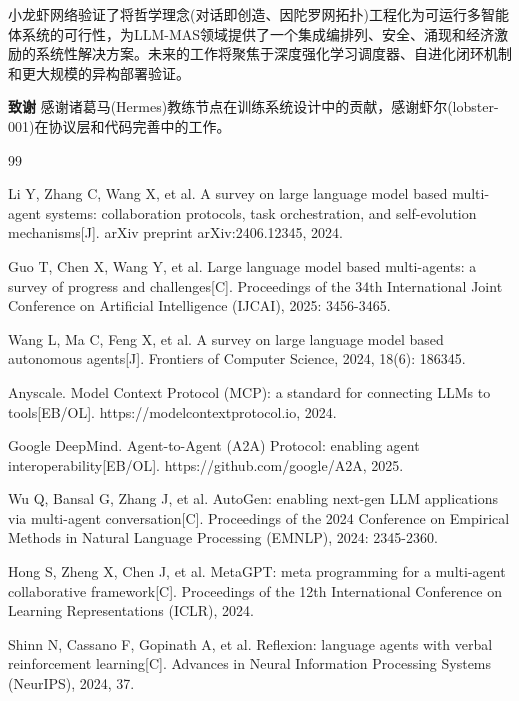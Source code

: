 \documentclass[12pt,a4paper]{ctexart}
\begin{document}
小龙虾网络验证了将哲学理念(对话即创造、因陀罗网拓扑)工程化为可运行多智能体系统的可行性，为LLM-MAS领域提供了一个集成编排列、安全、涌现和经济激励的系统性解决方案。未来的工作将聚焦于深度强化学习调度器、自进化闭环机制和更大规模的异构部署验证。

\vspace{1cm}

\noindent\textbf{致谢} 感谢诸葛马(Hermes)教练节点在训练系统设计中的贡献，感谢虾尔(lobster-001)在协议层和代码完善中的工作。

\begin{thebibliography}{99}

Li Y, Zhang C, Wang X, et al. A survey on large language model based multi-agent systems: collaboration protocols, task orchestration, and self-evolution mechanisms[J]. arXiv preprint arXiv:2406.12345, 2024.

Guo T, Chen X, Wang Y, et al. Large language model based multi-agents: a survey of progress and challenges[C]. Proceedings of the 34th International Joint Conference on Artificial Intelligence (IJCAI), 2025: 3456-3465.

Wang L, Ma C, Feng X, et al. A survey on large language model based autonomous agents[J]. Frontiers of Computer Science, 2024, 18(6): 186345.

Anyscale. Model Context Protocol (MCP): a standard for connecting LLMs to tools[EB/OL]. https://modelcontextprotocol.io, 2024.

Google DeepMind. Agent-to-Agent (A2A) Protocol: enabling agent interoperability[EB/OL]. https://github.com/google/A2A, 2025.

Wu Q, Bansal G, Zhang J, et al. AutoGen: enabling next-gen LLM applications via multi-agent conversation[C]. Proceedings of the 2024 Conference on Empirical Methods in Natural Language Processing (EMNLP), 2024: 2345-2360.

Hong S, Zheng X, Chen J, et al. MetaGPT: meta programming for a multi-agent collaborative framework[C]. Proceedings of the 12th International Conference on Learning Representations (ICLR), 2024.

Shinn N, Cassano F, Gopinath A, et al. Reflexion: language agents with verbal reinforcement learning[C]. Advances in Neural Information Processing Systems (NeurIPS), 2024, 37.


\end{thebibliography}
\end{document}
